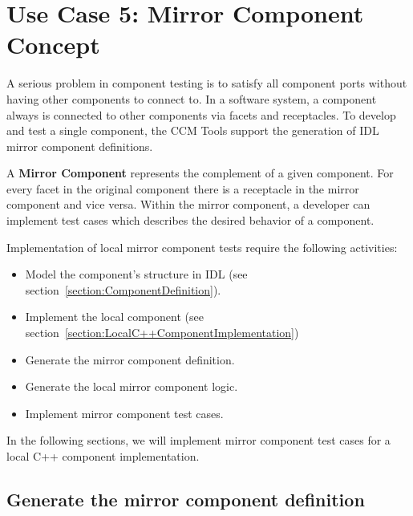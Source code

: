 \section{Use Case 5: Mirror Component Concept}
\label{section:MirrorComponentConcept}

A serious problem in component testing is to satisfy all component ports without
having other components to connect to.
In a software system, a component always is connected to other components via
facets and receptacles.
To develop and test a single component, the CCM Tools support the generation of 
IDL mirror component definitions. 

\vspace{3mm}
A {\bf Mirror Component} represents the complement of a given component. For every
facet in the original component there is a receptacle in the mirror component
and vice versa.
Within the mirror component, a developer can implement test cases which
describes the desired behavior of a component.

\vspace{3mm}
Implementation of local mirror component tests require the
following activities:
\begin{itemize}
	\item Model the component's structure in IDL (see section~\ref{section:ComponentDefinition}). 
	\item Implement the local component (see section~\ref{section:LocalC++ComponentImplementation})

	\item Generate the mirror component definition.
	\item Generate the local mirror component logic.
	\item Implement mirror component test cases.

\end{itemize}

In the following sections, we will implement mirror component test cases for a
local C++ component implementation.


\subsection{Generate the mirror component definition}
\label{subsection:GenerateMirrorComponentDefinition}

